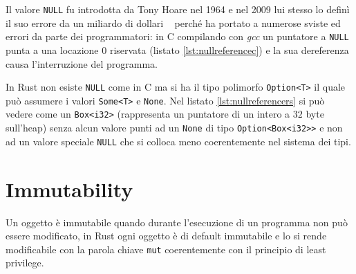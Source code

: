 \documentclass[Lau,binding=0.6cm]{sapthesis}
\begin{document}
Il valore \texttt{NULL} fu introdotta da Tony Hoare nel 1964 e nel 2009 lui stesso lo definì il suo errore da un miliardo di dollari ~\cite{hoare:billion_dollar_mistake} perché ha portato a numerose sviste ed errori da parte dei programmatori: in C compilando con \textit{gcc} un puntatore a \texttt{NULL} punta a una locazione $0$ riservata (listato \ref{lst:nullreferencec}) e la sua dereferenza causa l'interruzione del programma. 




In Rust non esiste \texttt{NULL} come in C ma si ha il tipo polimorfo \colorbox{backcolour}{\texttt{Option<T>}} il quale può assumere i valori \colorbox{backcolour}{\texttt{Some<T>}} e \colorbox{backcolour}{\texttt{None}}. Nel listato \ref{lst:nullreferencers} si può vedere come un \colorbox{backcolour}{\texttt{Box<i32>}} (rappresenta un puntatore di un intero a $32$ byte sull'heap) senza alcun valore punti ad un \colorbox{backcolour}{\texttt{None}} di tipo \texttt{Option<Box<i32>{}>} e non ad un valore speciale \texttt{NULL} che si colloca meno coerentemente nel sistema dei tipi.




\section{Immutability}
Un oggetto è immutabile quando durante l'esecuzione di un programma non può essere modificato, in Rust ogni oggetto è di default immutabile e lo si rende modificabile con la parola chiave \colorbox{backcolour}{\texttt{mut}} coerentemente con il principio di least privilege.
\end{document}
